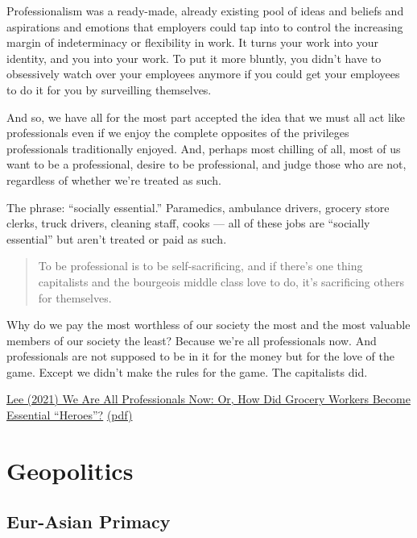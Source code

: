 \documentclass[
]{book}
\begin{document}
Professionalism was a
ready-made, already existing pool of ideas and beliefs and
aspirations and emotions that employers could tap into to
control the increasing margin of indeterminacy or flexibility in work.
It turns your
work into your identity, and you into your work.
To put it
more bluntly, you didn't have to obsessively watch over your
employees anymore if you could get your employees to do it
for you by surveilling themselves.

And so, we have all for the most part
accepted the idea that we must all act like professionals even
if we enjoy the complete opposites of the privileges
professionals traditionally enjoyed. And, perhaps most
chilling of all, most of us want to be a professional, desire to
be professional, and judge those who are not, regardless of
whether we're treated as such.

The phrase: ``socially essential.'' Paramedics,
ambulance drivers, grocery store clerks, truck drivers,
cleaning staff, cooks --- all of these jobs are ``socially
essential'' but aren't treated or paid as such.

\begin{quote}
To be professional is to be
self-sacrificing, and if there's one thing capitalists and the
bourgeois middle class love to do, it's sacrificing others for
themselves.
\end{quote}

Why do we pay the most worthless of our society the most and the most valuable members of our society the least?
Because we're all professionals now. And professionals are not supposed to be in it for the money but for the love of the game.
Except we didn't make the rules for the game.
The capitalists did.

\href{https://medium.com/@teioh/we-are-all-professionals-now-or-how-did-grocery-workers-become-heroes-4cba3ffcc034}{Lee (2021) We Are All Professionals Now: Or, How Did Grocery Workers Become Essential ``Heroes''?}
\href{pdf/Lee_Professionalism.pdf}{(pdf)}

\hypertarget{geopolitics}{%
\chapter{Geopolitics}\label{geopolitics}}

\hypertarget{eur-asian-primacy}{%
\section{Eur-Asian Primacy}\label{eur-asian-primacy}}
\end{document}
